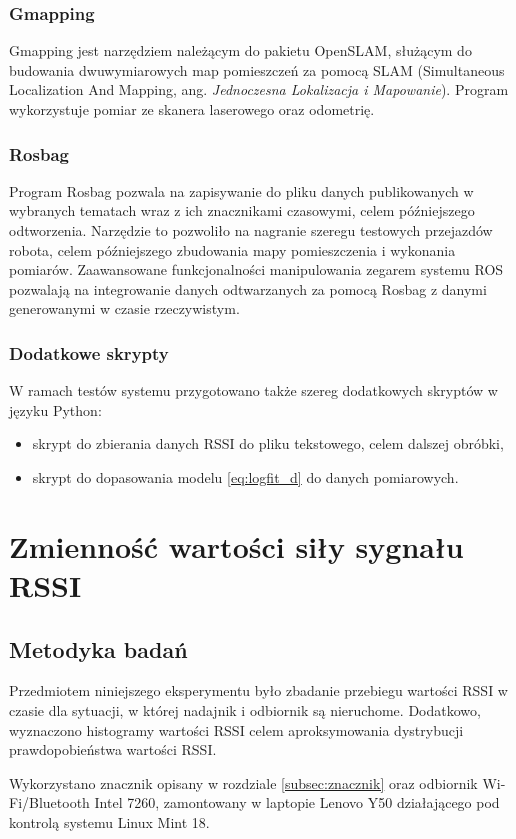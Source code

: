 \subsubsection{Gmapping}
Gmapping jest narzędziem należącym do pakietu OpenSLAM, służącym do budowania dwuwymiarowych map pomieszczeń za pomocą SLAM (Simultaneous Localization And Mapping, ang. \textit{Jednoczesna Lokalizacja i Mapowanie}). Program wykorzystuje pomiar ze skanera laserowego oraz odometrię. 

\subsubsection{Rosbag}
Program Rosbag pozwala na zapisywanie do pliku danych publikowanych w wybranych tematach wraz z ich znacznikami czasowymi, celem późniejszego odtworzenia. Narzędzie to pozwoliło na nagranie szeregu testowych przejazdów robota, celem późniejszego zbudowania mapy pomieszczenia i wykonania pomiarów. Zaawansowane funkcjonalności manipulowania zegarem systemu ROS pozwalają na integrowanie danych odtwarzanych za pomocą Rosbag z danymi generowanymi w czasie rzeczywistym.

\subsubsection{Dodatkowe skrypty}
W ramach testów systemu przygotowano także szereg dodatkowych skryptów w języku Python:
\begin{itemize}
 \item skrypt do zbierania danych RSSI do pliku tekstowego, celem dalszej obróbki,
 \item skrypt do dopasowania modelu \ref{eq:logfit_d} do danych pomiarowych.
\end{itemize}


\section{Zmienność wartości siły sygnału RSSI}
\label{sec:zmiennosc}
\subsection{Metodyka badań}
Przedmiotem niniejszego eksperymentu było zbadanie przebiegu wartości RSSI w czasie dla sytuacji, w której nadajnik i odbiornik są nieruchome. Dodatkowo, wyznaczono histogramy wartości RSSI celem aproksymowania dystrybucji prawdopobieństwa wartości RSSI. 

Wykorzystano znacznik opisany w rozdziale \ref{subsec:znacznik} oraz odbiornik Wi-Fi/Bluetooth Intel 7260, zamontowany w laptopie Lenovo Y50 działającego pod kontrolą systemu Linux Mint 18. 

